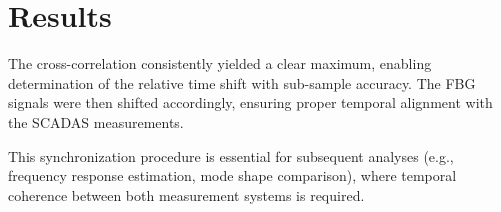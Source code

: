 \section*{Results}
The cross-correlation consistently yielded a clear maximum, enabling determination of the relative time shift with sub-sample accuracy. The FBG signals were then shifted accordingly, ensuring proper temporal alignment with the SCADAS measurements.

This synchronization procedure is essential for subsequent analyses (e.g., frequency response estimation, mode shape comparison), where temporal coherence between both measurement systems is required. \cite{calvo-palomino_nanosecond-precision_2018}



\cleardoublepage

